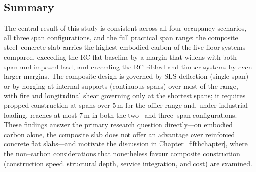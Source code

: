 \subsection{Summary}
\label{sec:res_summary}
The central result of this study is consistent across all four occupancy scenarios, all three span configurations, and the full practical span range: the composite steel--concrete slab carries the highest embodied carbon of the five floor systems compared, exceeding the RC flat baseline by a margin that widens with both span and imposed load, and exceeding the RC ribbed and timber systems by even larger margins. The composite design is governed by SLS deflection (single span) or by hogging at internal supports (continuous spans) over most of the range, with fire and longitudinal shear governing only at the shortest spans; it requires propped construction at spans over 5\,m for the office range and, under industrial loading, reaches at most 7\,m in both the two-- and three--span configurations. These findings answer the primary research question directly---on embodied carbon alone, the composite slab does not offer an advantage over reinforced concrete flat slabs---and motivate the discussion in Chapter~\ref{fifthchapter}, where the non--carbon considerations that nonetheless favour composite construction (construction speed, structural depth, service integration, and cost) are examined.
